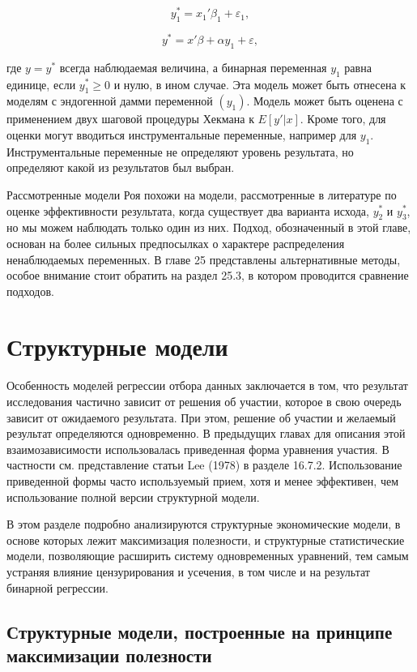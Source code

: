 \[
y_1^{*}=x_1'\beta_1+\varepsilon_1,
\]

\[
y^{*}=x'\beta+{\alpha}y_1+\varepsilon,
\]

где $y=y^{*}$ всегда наблюдаемая величина, а бинарная переменная $y_1$ равна единице, если $y_1^{*}{\geq}0$ и нулю, в ином случае. Эта модель может быть отнесена к моделям с эндогенной дамми переменной $(y_1)$. Модель может быть оценена с применением двух шаговой процедуры Хекмана к $E[y'|x]$. Кроме того, для оценки могут вводиться инструментальные переменные, например для $y_1$. Инструментальные переменные не определяют уровень результата, но определяют какой из результатов был выбран.

Рассмотренные модели Роя похожи на модели, рассмотренные в литературе по оценке эффективности результата, когда существует два варианта исхода, $y_2^{*}$ и $y_3^{*}$, но мы можем наблюдать только один из них. Подход, обозначенный в этой главе, основан на более сильных предпосылках о характере распределения ненаблюдаемых переменных. В главе 25 представлены альтернативные методы, особое внимание стоит обратить на раздел 25.3, в котором проводится сравнение подходов.

\section{Структурные модели}

Особенность моделей регрессии отбора данных заключается в том, что результат исследования частично зависит от решения об участии, которое в свою очередь зависит от ожидаемого результата. При этом, решение об участии и желаемый результат определяются одновременно. В предыдущих главах для описания этой взаимозависимости использовалась приведенная форма уравнения участия. В  частности см. представление статьи Lee (1978) в разделе 16.7.2. Использование приведенной формы часто используемый прием, хотя и менее эффективен, чем использование полной версии структурной модели. 

В этом разделе подробно анализируются структурные экономические модели, в основе которых лежит максимизация полезности, и структурные статистические модели, позволяющие расширить систему одновременных уравнений, тем самым устраняя влияние цензурирования и усечения, в том числе и на результат бинарной регрессии.

\subsection{Структурные модели, построенные на принципе максимизации полезности}

